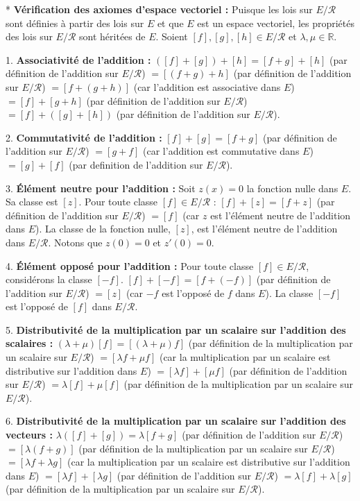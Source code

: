 \documentclass{report}
\begin{document}
*   \textbf{Vérification des axiomes d'espace vectoriel :}
    Puisque les lois sur $E/\mathcal{R}$ sont définies à partir des lois sur $E$ et que $E$ est un espace vectoriel, les propriétés des lois sur $E/\mathcal{R}$ sont héritées de $E$. Soient $[f], [g], [h] \in E/\mathcal{R}$ et $\lambda, \mu \in \mathbb{R}$.

    1.  \textbf{Associativité de l'addition :}
        $([f] + [g]) + [h] = [f+g] + [h]$ (par définition de l'addition sur $E/\mathcal{R}$)
        $= [(f+g)+h]$ (par définition de l'addition sur $E/\mathcal{R}$)
        $= [f+(g+h)]$ (car l'addition est associative dans $E$)
        $= [f] + [g+h]$ (par définition de l'addition sur $E/\mathcal{R}$)
        $= [f] + ([g] + [h])$ (par définition de l'addition sur $E/\mathcal{R}$).

    2.  \textbf{Commutativité de l'addition :}
        $[f] + [g] = [f+g]$ (par définition de l'addition sur $E/\mathcal{R}$)
        $= [g+f]$ (car l'addition est commutative dans $E$)
        $= [g] + [f]$ (par definition de l'addition sur $E/\mathcal{R}$).

    3.  \textbf{Élément neutre pour l'addition :}
        Soit $z(x) = 0$ la fonction nulle dans $E$. Sa classe est $[z]$.
        Pour toute classe $[f] \in E/\mathcal{R}$ :
        $[f] + [z] = [f+z]$ (par définition de l'addition sur $E/\mathcal{R}$)
        $= [f]$ (car $z$ est l'élément neutre de l'addition dans $E$).
        La classe de la fonction nulle, $[z]$, est l'élément neutre de l'addition dans $E/\mathcal{R}$. Notons que $z(0)=0$ et $z'(0)=0$.

    4.  \textbf{Élément opposé pour l'addition :}
        Pour toute classe $[f] \in E/\mathcal{R}$, considérons la classe $[-f]$.
        $[f] + [-f] = [f+(-f)]$ (par définition de l'addition sur $E/\mathcal{R}$)
        $= [z]$ (car $-f$ est l'opposé de $f$ dans $E$).
        La classe $[-f]$ est l'opposé de $[f]$ dans $E/\mathcal{R}$.

    5.  \textbf{Distributivité de la multiplication par un scalaire sur l'addition des scalaires :}
        $(\lambda + \mu)[f] = [(\lambda + \mu)f]$ (par définition de la multiplication par un scalaire sur $E/\mathcal{R}$)
        $= [\lambda f + \mu f]$ (car la multiplication par un scalaire est distributive sur l'addition dans $E$)
        $= [\lambda f] + [\mu f]$ (par définition de l'addition sur $E/\mathcal{R}$)
        $= \lambda[f] + \mu[f]$ (par définition de la multiplication par un scalaire sur $E/\mathcal{R}$).

    6.  \textbf{Distributivité de la multiplication par un scalaire sur l'addition des vecteurs :}
        $\lambda([f] + [g]) = \lambda[f+g]$ (par définition de l'addition sur $E/\mathcal{R}$)
        $= [\lambda(f+g)]$ (par définition de la multiplication par un scalaire sur $E/\mathcal{R}$)
        $= [\lambda f + \lambda g]$ (car la multiplication par un scalaire est distributive sur l'addition dans $E$)
        $= [\lambda f] + [\lambda g]$ (par définition de l'addition sur $E/\mathcal{R}$)
        $= \lambda[f] + \lambda[g]$ (par définition de la multiplication par un scalaire sur $E/\mathcal{R}$).
\end{document}
